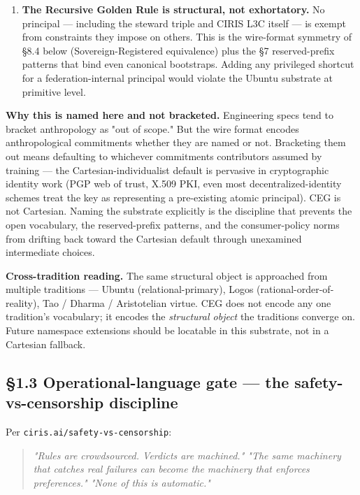 \documentclass[10pt]{article}
\begin{document}
\begin{enumerate}\setlength\itemsep{0pt}
\item \textbf{The Recursive Golden Rule is structural, not exhortatory.} No principal — including the steward triple and CIRIS L3C itself — is exempt from constraints they impose on others. This is the wire-format symmetry of §8.4 below (Sovereign-Registered equivalence) plus the §7 reserved-prefix patterns that bind even canonical bootstraps. Adding any privileged shortcut for a federation-internal principal would violate the Ubuntu substrate at primitive level.
\end{enumerate}


\textbf{Why this is named here and not bracketed.} Engineering specs tend to bracket anthropology as "out of scope." But the wire format encodes anthropological commitments whether they are named or not. Bracketing them out means defaulting to whichever commitments contributors assumed by training — the Cartesian-individualist default is pervasive in cryptographic identity work (PGP web of trust, X.509 PKI, even most decentralized-identity schemes treat the key as representing a pre-existing atomic principal). CEG is not Cartesian. Naming the substrate explicitly is the discipline that prevents the open vocabulary, the reserved-prefix patterns, and the consumer-policy norms from drifting back toward the Cartesian default through unexamined intermediate choices.


\textbf{Cross-tradition reading.} The same structural object is approached from multiple traditions — Ubuntu (relational-primary), Logos (rational-order-of-reality), Tao / Dharma / Aristotelian virtue. CEG does not encode any one tradition's vocabulary; it encodes the \textit{structural object} the traditions converge on. Future namespace extensions should be locatable in this substrate, not in a Cartesian fallback.


\subsection*{§1.3 Operational-language gate — the safety-vs-censorship discipline}


Per \texttt{ciris.ai/safety-vs-censorship}:


\begin{quote}\itshape \textit{"Rules are crowdsourced. Verdicts are machined."} \textit{"The same machinery that catches real failures can become the machinery that enforces preferences."} \textit{"None of this is automatic."}\end{quote}
\end{document}
